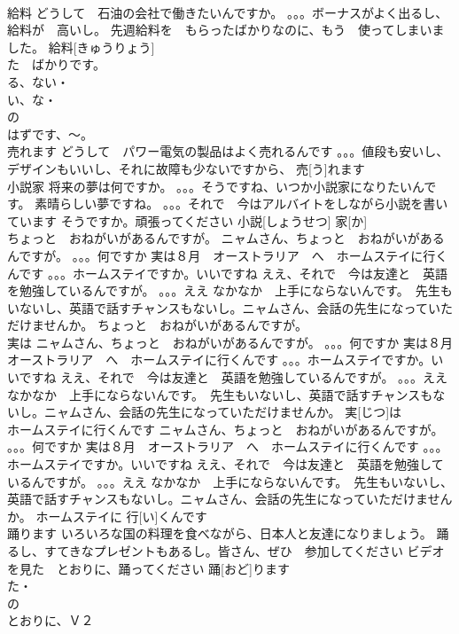 \documentclass[8pt]{extreport}
\begin{document}
\begin{CJK}{UTF8}{min}
\\	給料	どうして　石油の会社で働きたいんですか。 。。。ボーナスがよく出るし、給料が　高いし。 先週給料を　もらったばかりなのに、もう　使ってしまいました。	給料[きゅうりょう]				
\\	た　ばかりです。
\\	る、ない・
\\	い、な・
\\	の
\\	はずです、～。
\\	売れます	どうして　パワー電気の製品はよく売れるんです 。。。値段も安いし、デザインもいいし、それに故障も少ないですから、	売[う]れます					
\\	小説家	将来の夢は何ですか。 。。。そうですね、いつか小説家になりたいんです。 素晴らしい夢ですね。 。。。それで　今はアルバイトをしながら小説を書いています そうですか。頑張ってください	小説[しょうせつ] 家[か]					
\\	ちょっと　おねがいがあるんですが。	ニャムさん、ちょっと　おねがいがあるんですが。 。。。何ですか 実は８月　オーストラリア　へ　ホームステイに行くんです 。。。ホームステイですか。いいですね ええ、それで　今は友達と　英語を勉強しているんですが。 。。。ええ なかなか　上手にならないんです。　先生もいないし、英語で話すチャンスもないし。ニャムさん、会話の先生になっていただけませんか。	ちょっと　おねがいがあるんですが。						
\\	実は	ニャムさん、ちょっと　おねがいがあるんですが。 。。。何ですか 実は８月　オーストラリア　へ　ホームステイに行くんです 。。。ホームステイですか。いいですね ええ、それで　今は友達と　英語を勉強しているんですが。 。。。ええ なかなか　上手にならないんです。　先生もいないし、英語で話すチャンスもないし。ニャムさん、会話の先生になっていただけませんか。	実[じつ]は					
\\	ホームステイに行くんです	ニャムさん、ちょっと　おねがいがあるんですが。 。。。何ですか 実は８月　オーストラリア　へ　ホームステイに行くんです 。。。ホームステイですか。いいですね ええ、それで　今は友達と　英語を勉強しているんですが。 。。。ええ なかなか　上手にならないんです。　先生もいないし、英語で話すチャンスもないし。ニャムさん、会話の先生になっていただけませんか。	ホームステイに 行[い]くんです					
\\	踊ります	いろいろな国の料理を食べながら、日本人と友達になりましょう。 踊るし、すてきなプレゼントもあるし。皆さん、ぜひ　参加してください ビデオを見た　とおりに、踊ってください	踊[おど]ります				
\\	た・
\\	の
\\	とおりに、Ｖ２

\end{CJK}
\end{document}
